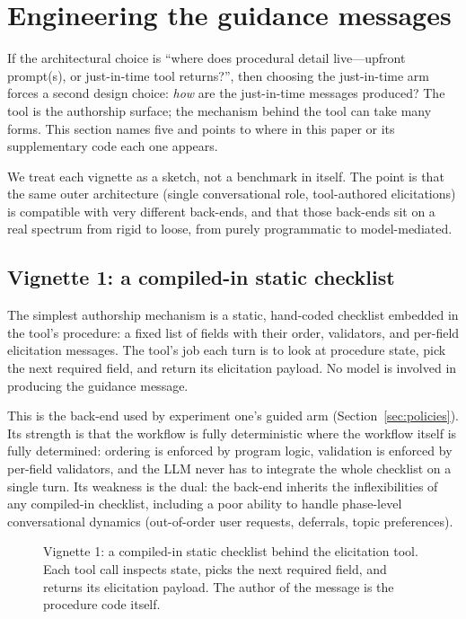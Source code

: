 \documentclass[11pt,a4paper]{article}
\begin{document}
\section{Engineering the guidance messages}
\label{sec:engineering}

If the architectural choice is ``where does procedural detail live---upfront prompt(s), or just-in-time tool returns?'', then choosing the just-in-time arm forces a second design choice: \emph{how} are the just-in-time messages produced? The tool is the authorship surface; the mechanism behind the tool can take many forms. This section names five and points to where in this paper or its supplementary code each one appears.

We treat each vignette as a sketch, not a benchmark in itself. The point is that the same outer architecture (single conversational role, tool-authored elicitations) is compatible with very different back-ends, and that those back-ends sit on a real spectrum from rigid to loose, from purely programmatic to model-mediated.

\subsection{Vignette 1: a compiled-in static checklist}

The simplest authorship mechanism is a static, hand-coded checklist embedded in the tool's procedure: a fixed list of fields with their order, validators, and per-field elicitation messages. The tool's job each turn is to look at procedure state, pick the next required field, and return its elicitation payload. No model is involved in producing the guidance message.

This is the back-end used by experiment one's guided arm (Section~\ref{sec:policies}). Its strength is that the workflow is fully deterministic where the workflow itself is fully determined: ordering is enforced by program logic, validation is enforced by per-field validators, and the LLM never has to integrate the whole checklist on a single turn. Its weakness is the dual: the back-end inherits the inflexibilities of any compiled-in checklist, including a poor ability to handle phase-level conversational dynamics (out-of-order user requests, deferrals, topic preferences).

\begin{figure}[htbp]
  \centering
  
  \caption{Vignette 1: a compiled-in static checklist behind the elicitation
  tool. Each tool call inspects state, picks the next required field, and
  returns its elicitation payload. The author of the message is the procedure
  code itself.}
  \label{fig:tool-internals-script}
\end{figure}
\end{document}
